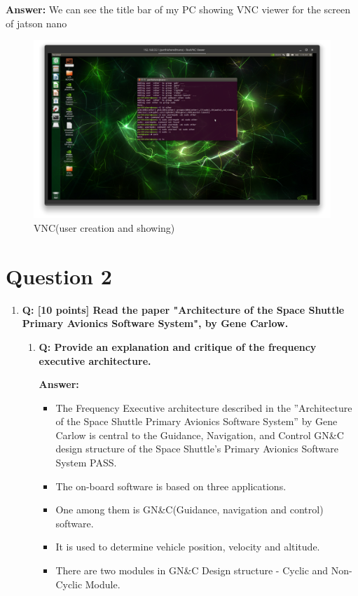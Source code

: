 \documentclass[a4paper,11pt]{article}%
\newenvironment{qanda}{\setlength{\parindent}{0pt}}{\bigskip}
\newcommand{\Q}{\bigskip\bfseries Q: }
\newcommand{\A}{\par\textbf{Answer: } \normalfont}
\begin{document}
\begin{qanda}
\begin{enumerate}
\begin{enumerate}
				      \A We can see the title bar of my PC showing VNC viewer for the screen of jatson nano
				      \begin{figure}[H]
					      \centering
					      \includegraphics[scale=0.32]{figures/vnc.png}
					      \caption{VNC(user creation and showing)}
				      \end{figure}



			\end{enumerate}


	\end{enumerate}




	\section{Question 2}
	\begin{enumerate}
		\item[] \Q [10 points] Read the paper "Architecture of the Space Shuttle Primary Avionics Software
			System", by Gene Carlow.
			\begin{enumerate}
				\item \Q Provide an explanation and critique of the frequency executive architecture.

				      \A
				      \begin{itemize}
					      \item The Frequency Executive architecture described in the ”Architecture of the Space Shuttle Primary Avionics Software System” by Gene Carlow is central to the Guidance, Navigation, and Control GN\&C design structure
					            of the Space Shuttle’s Primary Avionics Software System PASS.
					      \item The on-board software is based on three applications.
					      \item One among them is GN\&C(Guidance, navigation and control) software.
					      \item It is used to determine vehicle position, velocity and altitude.
					      \item There are two modules in GN\&C Design structure - Cyclic and Non-Cyclic Module.
				      \end{itemize}


\end{enumerate}
\end{enumerate}
\end{qanda}
\end{document}

